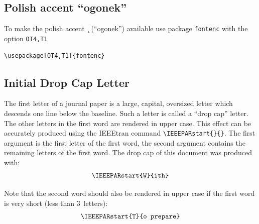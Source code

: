 \documentclass[conference]{IEEEtran}
\begin{document}
\subsection{Polish accent ``ogonek''}
To make the polish accent {\k \ } (``ogonek'') available use package \verb|fontenc| with the option \verb|OT4,T1|
\begin{verbatim}
\usepackage[OT4,T1]{fontenc}
\end{verbatim}

\subsection{Initial Drop Cap Letter}
 The first letter of a journal paper is a large, capital, oversized
letter which descends one line below the baseline. Such a
letter is called a ``drop cap'' letter. The other letters in the first
word are rendered in upper case. This effect can be accurately
produced using the IEEEtran command \verb|\IEEEPARstart{}{}|. The first argument is the first letter of the first word, the
second argument contains the remaining letters of the first
word. The drop cap of this document was produced with:
$$\verb|\IEEEPARstart{W}{ith}|$$

Note that the second word should also be rendered  in
upper case if the first word is very short (less than 3~letters):
$$\verb|\IEEEPARstart{T}{o prepare}|$$
\end{document}
